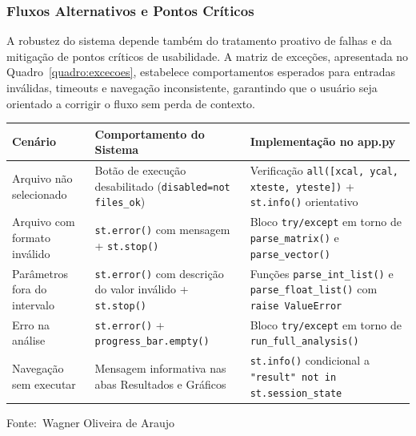 \documentclass[12pt,a4paper]{article}
\newcommand{\oautor}{Wagner Oliveira de Araujo}
\begin{document}
\subsubsection{Fluxos Alternativos e Pontos Críticos}

A robustez do sistema depende também do tratamento proativo de falhas e da mitigação de pontos críticos de usabilidade. A matriz de exceções, apresentada no Quadro~\ref{quadro:excecoes}, estabelece comportamentos esperados para entradas inválidas, timeouts e navegação inconsistente, garantindo que o usuário seja orientado a corrigir o fluxo sem perda de contexto.

\begin{quadro}[ht]
\centering
\small
\caption{Tratamento de exceções e usabilidade}
\label{quadro:excecoes}
\begin{threeparttable}
\begin{tabularx}{\textwidth}{|l|X|X|} \hline
\textbf{Cenário} & \textbf{Comportamento do Sistema} & \textbf{Implementação no app.py} \\ \hline
Arquivo não selecionado & Botão de execução desabilitado (\texttt{disabled=not files\_ok}) & Verificação \texttt{all([xcal, ycal, xteste, yteste])} + \texttt{st.info()} orientativo \\ \hline
Arquivo com formato inválido & \texttt{st.error()} com mensagem + \texttt{st.stop()} & Bloco \texttt{try/except} em torno de \texttt{parse\_matrix()} e \texttt{parse\_vector()} \\ \hline
Parâmetros fora do intervalo & \texttt{st.error()} com descrição do valor inválido + \texttt{st.stop()} & Funções \texttt{parse\_int\_list()} e \texttt{parse\_float\_list()} com \texttt{raise ValueError} \\ \hline
Erro na análise & \texttt{st.error()} + \texttt{progress\_bar.empty()} & Bloco \texttt{try/except} em torno de \texttt{run\_full\_analysis()} \\ \hline
Navegação sem executar & Mensagem informativa nas abas Resultados e Gráficos & \texttt{st.info()} condicional a \texttt{"result" not in st.session\_state} \\ \hline\end{tabularx}
\begin{tablenotes}[flushleft]
\footnotesize
\item Fonte:~\oautor
\end{tablenotes}
\end{threeparttable}
\end{quadro}
\end{document}
